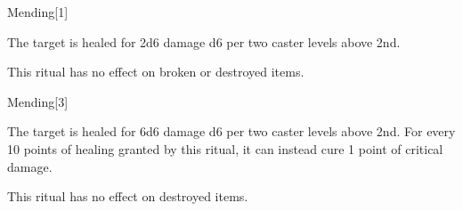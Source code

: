\begin{spellsection}{Mending}[1]
    \begin{spellheader}
    \end{spellheader}
    \begin{spellcontent}
        \begin{spelltargetinginfo}
        \end{spelltargetinginfo}
        \begin{spelleffects}

            \spelleffect The target is healed for 2d6 damage \add d6 per two caster levels above 2nd. 
        \end{spelleffects}
    \end{spellcontent}
    \begin{spellfooter}
        \spellnotes This ritual has no effect on broken or destroyed items. 
    \end{spellfooter}
\end{spellsection}

\begin{spellsection}[Greater]{Mending}[3]
    \begin{spellheader}
    \end{spellheader}
    \begin{spellcontent}
        \begin{spelltargetinginfo}
        \end{spelltargetinginfo}
        \begin{spelleffects}

            \spelleffect The target is healed for 6d6 damage \add d6 per two caster levels above 2nd. For every 10 points of healing granted by this ritual, it can instead cure 1 point of critical damage.
        \end{spelleffects}
    \end{spellcontent}
    \begin{spellfooter}
        \spellnotes This ritual has no effect on destroyed items.
    \end{spellfooter}
\end{spellsection}

